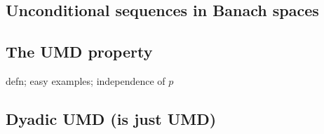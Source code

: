 \subsection{Unconditional sequences in Banach spaces}

\subsection{The UMD property}

defn; easy examples; independence of $p$

\subsection{Dyadic UMD (is just UMD)}


